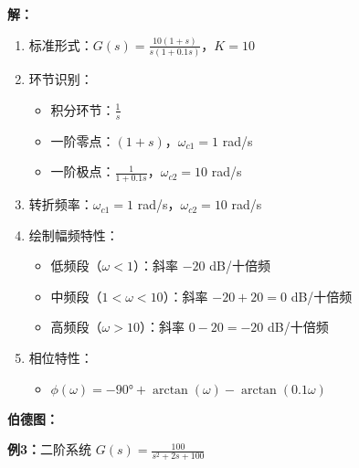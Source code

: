 \textbf{解：}
\begin{enumerate}
    \item 标准形式：$G(s) = \frac{10(1+s)}{s(1+0.1s)}$，$K = 10$
    \item 环节识别：
    \begin{itemize}
        \item 积分环节：$\frac{1}{s}$
        \item 一阶零点：$(1+s)$，$\omega_{c1} = 1$ rad/s
        \item 一阶极点：$\frac{1}{1+0.1s}$，$\omega_{c2} = 10$ rad/s
    \end{itemize}
    \item 转折频率：$\omega_{c1} = 1$ rad/s，$\omega_{c2} = 10$ rad/s
    \item 绘制幅频特性：
    \begin{itemize}
        \item 低频段（$\omega < 1$）：斜率 $-20$ dB/十倍频
        \item 中频段（$1 < \omega < 10$）：斜率 $-20+20 = 0$ dB/十倍频
        \item 高频段（$\omega > 10$）：斜率 $0-20 = -20$ dB/十倍频
    \end{itemize}
    \item 相位特性：
    \begin{itemize}
        \item $\phi(\omega) = -90° + \arctan(\omega) - \arctan(0.1\omega)$
    \end{itemize}
\end{enumerate}

\textbf{伯德图：}
\begin{center}
\end{center}

\textbf{例3：}二阶系统 $G(s) = \frac{100}{s^2 + 2s + 100}$

